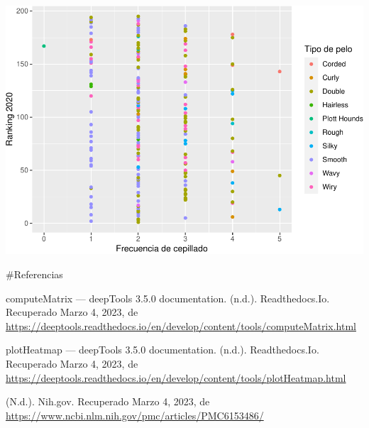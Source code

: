 \documentclass[
]{article}
\begin{document}
\includegraphics{Entrega04_files/figure-latex/unnamed-chunk-6-1.pdf}

\#Referencias

computeMatrix --- deepTools 3.5.0 documentation. (n.d.). Readthedocs.Io.
Recuperado Marzo 4, 2023, de
\url{https://deeptools.readthedocs.io/en/develop/content/tools/computeMatrix.html}

plotHeatmap --- deepTools 3.5.0 documentation. (n.d.). Readthedocs.Io.
Recuperado Marzo 4, 2023, de
\url{https://deeptools.readthedocs.io/en/develop/content/tools/plotHeatmap.html}

(N.d.). Nih.gov. Recuperado Marzo 4, 2023, de
\url{https://www.ncbi.nlm.nih.gov/pmc/articles/PMC6153486/}
\end{document}
